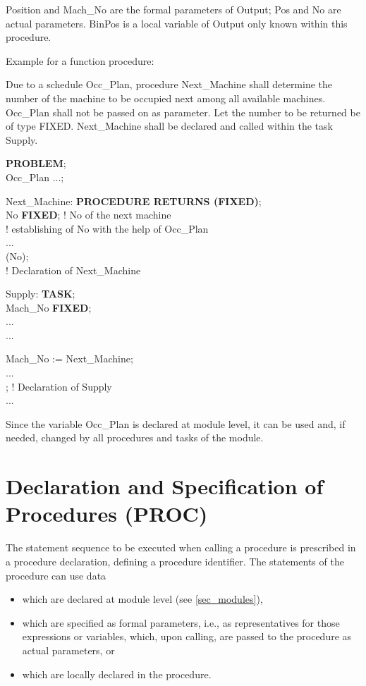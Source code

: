 Position and Mach\_No are the formal parameters of Output; Pos and No
are actual parameters. BinPos is a local variable of Output only known
within this procedure.

Example for a function procedure:

Due to a schedule Occ\_Plan, procedure Next\_Machine shall determine the
number of the machine to be occupied next among all available machines.
Occ\_Plan shall not be passed on as parameter. Let the number to be
returned be of type FIXED. Next\_Machine shall be declared and called
within the task Supply.

{\bf PROBLEM};\\
 Occ\_Plan ...; 

\x Next\_Machine: {\bf PROCEDURE RETURNS (FIXED)};\\
\x {} No {\bf FIXED}; ! No of the next machine\\
\x \x ! establishing of No with the help of Occ\_Plan\\
\x \x ...\\
\x {} (No);\\
 ! Declaration of Next\_Machine

\x Supply: {\bf TASK};\\
\x {} Mach\_No {\bf FIXED};\\
\x \x ... \\
\x \x ...

\x \x Mach\_No := Next\_Machine;\\
\x \x ... \\
; ! Declaration of Supply\\
\x ...

Since the variable Occ\_Plan is declared at module level, it can be used
and, if needed, changed by all procedures and tasks of the module.

\section{Declaration and Specification of Procedures (PROC)}  %
\label{sec_proc_dcl}

The statement sequence to be executed when calling a procedure is
prescribed in a procedure declaration, defining a procedure identifier.
The statements of the procedure can use data
\begin{itemize}
\item which are declared at module level
(see \ref{sec_modules}),
\item which are specified as formal parameters, i.e., as representatives
for those expressions or variables, which, upon calling, are passed
to the procedure as actual parameters, or
\item which are locally declared in the procedure.
\end{itemize}

